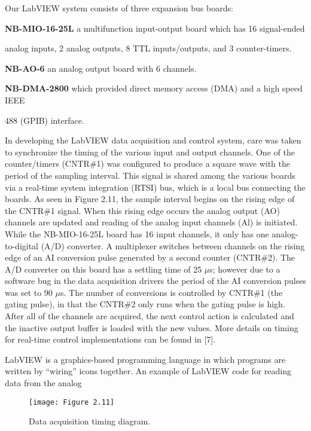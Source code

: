 Our LabVIEW system consists of three expansion bus boards:

\noindent\textbf{NB-MIO-16-25L} a multifunction input-output board which has 16 signal-ended 

analog inputs, 2 analog outputs, 8 TTL inputs/outputs, and 3 counter-timers.


\noindent\textbf{NB-AO-6} an analog output board with 6 channels.


\noindent\textbf{NB-DMA-2800} which provided direct memory access (DMA) and a high speed IEEE

488 (GPIB) interface.


In developing the LabVIEW data acquisition and control system, care was taken to synchronize the timing of the various input and output channels. One of the counter/timers (CNTR\#1) was configured to produce a square wave with the period of the sampling interval. This signal is shared among the various boards via a real-time system integration (RTSI) bus, which is a local bus connecting the boards. As seen in Figure 2.11, the sample interval begins on the rising edge of the CNTR\#1 signal. When this rising edge occurs the analog output (AO) channels are updated and reading of the analog input channels (Al) is initiated. While the NB-MIO-16-25L board has 16 input channels, it only has one analog-to-digital (A/D) converter. A multiplexer switches between channels on the rising edge of an AI conversion pulse generated by a second counter (CNTR\#2). The A/D converter on this board has a settling time of 25 $\mu$s; however due to a software bug in the data acquisition drivers the period of the AI conversion pulses was set to 90 $\mu$s. The number of conversions is controlled by CNTR\#1 (the gating pulse), in that the CNTR\#2 only runs when the gating pulse is high. After all of the channels are acquired, the next control action is calculated and the inactive output buffer is loaded with the new values. More details on timing for real-time control implementations can be found in [7].


LabVIEW is a graphics-based programming language in which programs are written by “wiring” icons together. An example of LabVIEW code for reading data from the analog

\begin{figure}[H]
	\centering
	\texttt{[image: Figure 2.11]}
	\bf\caption{  Data acquisition timing diagram.}
	\label{fig:2.11}
\end{figure}

